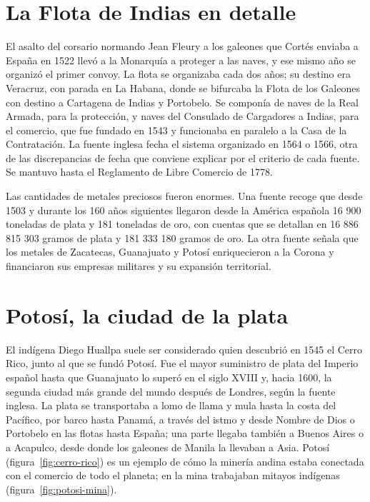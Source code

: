 \documentclass{book}
\begin{document}

\section{La Flota de Indias en detalle}

El asalto del corsario normando Jean Fleury a los galeones que Cortés enviaba a España en 1522 llevó a la Monarquía a proteger a las naves, y ese mismo año se organizó el primer convoy. La flota se organizaba cada dos años; su destino era Veracruz, con parada en La Habana, donde se bifurcaba la Flota de los Galeones con destino a Cartagena de Indias y Portobelo. Se componía de naves de la Real Armada, para la protección, y naves del Consulado de Cargadores a Indias, para el comercio, que fue fundado en 1543 y funcionaba en paralelo a la Casa de la Contratación. La fuente inglesa fecha el sistema organizado en 1564 o 1566, otra de las discrepancias de fecha que conviene explicar por el criterio de cada fuente. Se mantuvo hasta el Reglamento de Libre Comercio de 1778.


Las cantidades de metales preciosos fueron enormes. Una fuente recoge que desde 1503 y durante los 160 años siguientes llegaron desde la América española 16 900 toneladas de plata y 181 toneladas de oro, con cuentas que se detallan en 16 886 815 303 gramos de plata y 181 333 180 gramos de oro. La otra fuente señala que los metales de Zacatecas, Guanajuato y Potosí enriquecieron a la Corona y financiaron sus empresas militares y su expansión territorial.


\section{Potosí, la ciudad de la plata}

El indígena Diego Huallpa suele ser considerado quien descubrió en 1545 el Cerro Rico, junto al que se fundó Potosí. Fue el mayor suministro de plata del Imperio español hasta que Guanajuato lo superó en el siglo XVIII y, hacia 1600, la segunda ciudad más grande del mundo después de Londres, según la fuente inglesa. La plata se transportaba a lomo de llama y mula hasta la costa del Pacífico, por barco hasta Panamá, a través del istmo y desde Nombre de Dios o Portobelo en las flotas hasta España; una parte llegaba también a Buenos Aires o a Acapulco, desde donde los galeones de Manila la llevaban a Asia. Potosí (figura~\ref{fig:cerro-rico}) es un ejemplo de cómo la minería andina estaba conectada con el comercio de todo el planeta; en la mina trabajaban mitayos indígenas (figura~\ref{fig:potosi-mina}).
\end{document}
